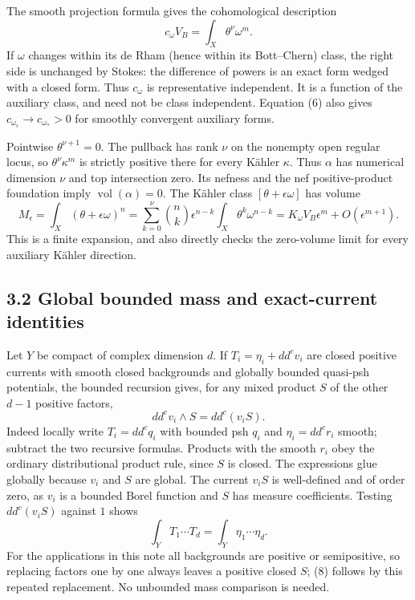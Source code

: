 \documentclass[
  11pt,
]{article}
\begin{document}
The smooth projection formula gives the cohomological description \[
c_\omega V_B=\int_X\theta^\nu\omega^m.                              \tag{6}
\] If \(\omega\) changes within its de Rham (hence within its Bott--Chern) class, the right side is unchanged by Stokes: the difference of powers is an exact form wedged with a closed form. Thus \(c_\omega\) is representative independent. It is a function of the auxiliary class, and need not be class independent. Equation (6) also gives \(c_{\omega_\epsilon}\to c_{\omega_*}>0\) for smoothly convergent auxiliary forms.

Pointwise \(\theta^{\nu+1}=0\). The pullback has rank \(\nu\) on the nonempty open regular locus, so \(\theta^\nu\kappa^m\) is strictly positive there for every Kähler \(\kappa\). Thus \(\alpha\) has numerical dimension \(\nu\) and top intersection zero. Its nefness and the nef positive-product foundation imply \(\operatorname{vol}(\alpha)=0\). The Kähler class \([\theta+\epsilon\omega]\) has volume \[
M_\epsilon=\int_X(\theta+\epsilon\omega)^n
=\sum_{k=0}^{\nu}\binom nk\epsilon^{n-k}
\int_X\theta^k\omega^{n-k}
=K_\omega V_B\epsilon^m+O(\epsilon^{m+1}).                           \tag{7}
\] This is a finite expansion, and also directly checks the zero-volume limit for every auxiliary Kähler direction.

\subsection{3.2 Global bounded mass and exact-current identities}\label{global-bounded-mass-and-exact-current-identities}

Let \(Y\) be compact of complex dimension \(d\). If \(T_i=\eta_i+dd^c v_i\) are closed positive currents with smooth closed backgrounds and globally bounded quasi-psh potentials, the bounded recursion gives, for any mixed product \(S\) of the other \(d-1\) positive factors, \[
dd^c v_i\wedge S=dd^c(v_iS).
\] Indeed locally write \(T_i=dd^c q_i\) with bounded psh \(q_i\) and \(\eta_i=dd^c r_i\) smooth; subtract the two recursive formulas. Products with the smooth \(r_i\) obey the ordinary distributional product rule, since \(S\) is closed. The expressions glue globally because \(v_i\) and \(S\) are global. The current \(v_iS\) is well-defined and of order zero, as \(v_i\) is a bounded Borel function and \(S\) has measure coefficients. Testing \(dd^c(v_iS)\) against \(1\) shows \[
\int_Y T_1\cdots T_d=\int_Y\eta_1\cdots\eta_d.                     \tag{8}
\] For the applications in this note all backgrounds are positive or semipositive, so replacing factors one by one always leaves a positive closed \(S\); (8) follows by this repeated replacement. No unbounded mass comparison is needed.
\end{document}

